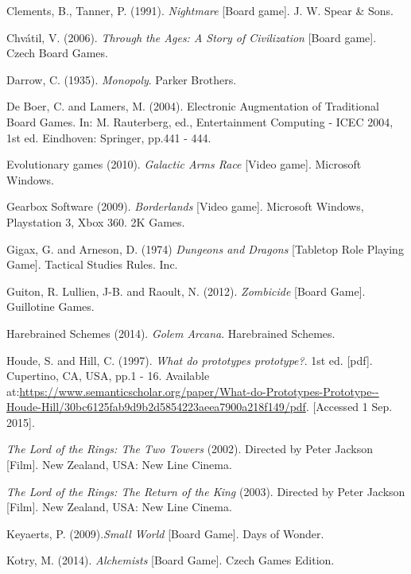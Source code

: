 \documentclass[a4paper,11pt]{report}
\begin{document}
\begin{thebibliography}{1}
Clements, B., Tanner, P. (1991). \textit{Nightmare} [Board game]. J. W. Spear \& Sons.

Chvátil, V. (2006). \textit{Through the Ages: A Story of Civilization} [Board game]. Czech Board Games.

Darrow, C. (1935). \textit{Monopoly}. Parker Brothers.

De Boer, C. and Lamers, M. (2004). Electronic Augmentation of Traditional Board Games. In: M. Rauterberg, ed., Entertainment Computing - ICEC 2004, 1st ed. Eindhoven: Springer, pp.441 - 444.


Evolutionary games (2010). \textit{Galactic Arms Race} [Video game]. Microsoft Windows. 

Gearbox Software (2009). \textit{Borderlands} [Video game]. Microsoft Windows, Playstation 3, Xbox 360. 2K Games.

Gigax, G. and Arneson, D. (1974) \textit{Dungeons and Dragons} [Tabletop Role Playing Game]. Tactical Studies Rules. Inc.

Guiton, R. Lullien, J-B. and Raoult, N. (2012). \textit{Zombicide} [Board Game]. Guillotine Games.

Harebrained Schemes (2014). \textit{Golem Arcana}. Harebrained Schemes.

Houde, S. and Hill, C. (1997). \textit{What do prototypes prototype?}. 1st ed. [pdf]. Cupertino, CA, USA, pp.1 - 16. Available at:\url{https://www.semanticscholar.org/paper/What-do-Prototypes-Prototype--Houde-Hill/30bc6125fab9d9b2d5854223aeea7900a218f149/pdf}. [Accessed 1 Sep. 2015].

\textit{The Lord of the Rings: The Two Towers} (2002). Directed by Peter Jackson [Film]. New Zealand, USA: New Line Cinema.

\textit{The Lord of the Rings: The Return of the King} (2003). Directed by Peter Jackson [Film]. New Zealand, USA: New Line Cinema.

Keyaerts, P. (2009).\textit{Small World} [Board Game]. Days of Wonder.

Kotry, M. (2014). \textit{Alchemists} [Board Game]. Czech Games Edition.


\end{thebibliography}
\end{document}

